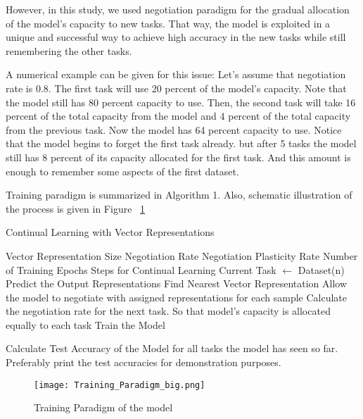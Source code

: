 \documentclass{article}
\begin{document}
However, in this study, we used negotiation paradigm for the gradual allocation of the model's capacity to new tasks. That way, the model is exploited in a unique and successful way to achieve high accuracy in the new tasks while still remembering the other tasks. 

A numerical example can be given for this issue: Let's assume that negotiation rate is 0.8. 
The first task will use 20 percent of the model's capacity. Note that the model still has 80 percent capacity to use. 
Then, the second task will take 16 percent of the total capacity from the model and 4 percent of the total capacity from the previous task. Now the model has 64 percent capacity to use. Notice that the model begins to forget the first task already. but after 5 tasks the model still has 8 percent of its capacity allocated for the first task. And this amount is enough to remember some aspects of the first dataset. 


Training paradigm is summarized in Algorithm 1.
Also, schematic illustration of the process is given in Figure ~\ref{fig:Training_paradigm_big}

\begin{algorithm}
\caption{Continual Learning with Vector Representations}
\begin{algorithmic}[1]
\Require Vector Representation Size
\Require Negotiation Rate
\Require Negotiation Plasticity Rate
\Require Number of Training Epochs Steps for Continual Learning
    \State Current Task $\gets$ Dataset(n)
        \State Predict the Output Representations
        \State Find Nearest Vector Representation
        \State Allow the model to negotiate with assigned representations for each sample
        \State Calculate the negotiation rate for the next task. So that model's capacity is allocated equally to each task
    \EndFor
    \State Train the Model

        \State Calculate Test Accuracy of the Model for all tasks the model has seen so far. 
        \State Preferably print the test accuracies for demonstration purposes. 
    \EndFor
\EndFor
\end{algorithmic}
\end{algorithm}


\begin{figure}[ht]
\centering
\texttt{[image: Training\_Paradigm\_big.png]}
\caption{Training Paradigm of the model}
\label{fig:Training_paradigm_big}
\end{figure}
\end{document}
